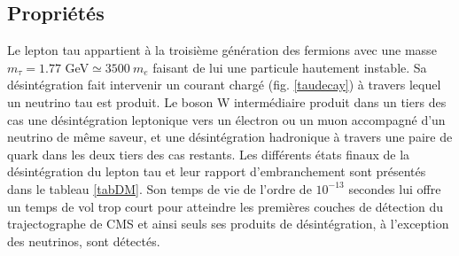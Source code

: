 \subsection{Propriétés}
\label{tau properties}
Le lepton tau appartient à la troisième génération des fermions avec une masse $m_{\tau}=1.77$ GeV$\simeq3500~m_e$ faisant de lui une particule hautement instable. Sa désintégration fait intervenir un courant chargé (fig. \ref{taudecay}) à travers lequel un neutrino tau est produit. Le boson W intermédiaire produit dans un tiers des cas une désintégration leptonique vers un électron ou un muon accompagné d'un neutrino de même saveur, et une désintégration hadronique à travers une paire de quark dans les deux tiers des cas restants. Les différents états finaux de la désintégration du lepton tau et leur rapport d'embranchement sont présentés dans le tableau \ref{tabDM}. Son temps de vie de l'ordre de $10^{-13}$ secondes lui offre un temps de vol trop court pour atteindre les premières couches de détection du trajectographe de CMS et ainsi seuls ses produits de désintégration, à l'exception des neutrinos, sont détectés. \\

